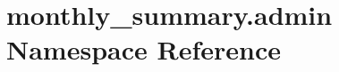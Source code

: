 \hypertarget{namespacemonthly__summary_1_1admin}{\section{monthly\-\_\-summary.\-admin Namespace Reference}
\label{namespacemonthly__summary_1_1admin}
}
